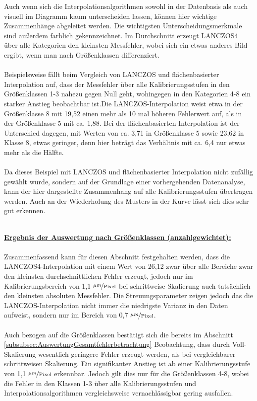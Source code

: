 \documentclass[
fontsize=10pt, 
listof = totoc,
parskip = half	
]{report}
\begin{document}
\noindent Auch wenn sich die Interpolationsalgorithmen sowohl in der Datenbasis als auch visuell im Diagramm kaum unterscheiden lassen, können hier wichtige Zusammenhänge abgeleitet werden. Die wichtigsten Unterscheidungsmerkmale sind außerdem farblich gekennzeichnet. Im Durchschnitt erzeugt LANCZOS4 über alle Kategorien den kleinsten Messfehler, wobei sich ein etwas anderes Bild ergibt, wenn man nach Größenklassen differenziert.
\\\\
Beispielsweise fällt beim Vergleich von LANCZOS und flächenbasierter Interpolation auf, dass der Messfehler über alle Kalibrierungsstufen in den Größenklassen 1-3 nahezu gegen Null geht, wohingegen in den Kategorien 4-8 ein starker Anstieg beobachtbar ist.Die LANCZOS-Interpolation weist etwa in der Größenklasse 8 mit 19,52 einen mehr als 10 mal höheren Fehlerwert auf, als in der Größenklasse 5 mit ca. 1,88. Bei der flächenbasierten Interpolation  ist der Unterschied dagegen, mit Werten von ca. 3,71 in Größenklasse 5 sowie 23,62 in Klasse 8, etwas geringer, denn hier beträgt das Verhältnis mit ca. 6,4 nur etwas mehr als die Hälfte. 
\\\\
Da dieses Beispiel mit LANCZOS und flächenbasierter Interpolation nicht zufällig gewählt wurde, sondern auf der Grundlage einer vorhergehenden Datenanalyse, kann der hier dargestellte Zusammenhang auf alle Kalibrierungsstufen übertragen werden. Auch an der Wiederholung des Musters in der Kurve lässt sich dies sehr gut erkennen. 
\\\\
\colorbox{gray!10}{
	\label{box:ErgebnisGesamtauswertung}
	\begin{minipage}{0.975\textwidth}
		\textbf{\underline{Ergebnis der Auswertung nach Größenklassen (anzahlgewichtet):}}
		\\\\
		Zusammenfassend kann für diesen Abschnitt festgehalten werden, dass die LANCZOS4-Interpolation mit einem Wert von 26,12 zwar über alle Bereiche zwar den kleinsten durchschnittlichen Fehler erzeugt, jedoch nur im Kalibrierungsbereich von 1,1 $\nicefrac{\mu m}{\text{Pixel}}$ bei schrittweise Skalierung auch tatsächlich den kleinsten absoluten Messfehler. Die Streuungsparameter zeigen jedoch das die LANCZOS-Interpolation nicht immer die niedrigste Varianz in den Daten aufweist, sondern nur im Bereich von 0,7 $\nicefrac{\mu m}{\text{Pixel}}$.
		\\\\
		Auch bezogen auf die Größenklassen bestätigt sich die bereits im Abschnitt \ref{subsubsec:AuswertungGesamtfehlerbetrachtung} Beobachtung, dass durch Voll-Skalierung wesentlich geringere Fehler erzeugt werden, als bei vergleichbarer schrittweisen Skalierung.
		Ein signifikanter Anstieg ist ab einer Kalibrierungsstufe von 1,1 $\nicefrac{\mu m}{\text{Pixel}}$ erkennbar. Jedoch gilt dies nur für die Größenklassen 4-8, wobei die Fehler in den Klassen 1-3 über alle Kalibrierungsstufen und Interpolationsalgorithmen vergleichsweise vernachlässigbar gering ausfallen.
	\end{minipage}
}
\\\\\\
\end{document}
